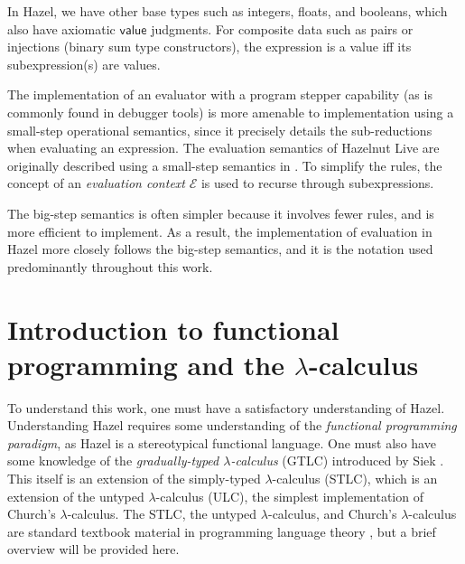 \begin{singlespace}
  \begin{mathpar}
  \end{mathpar}
\end{singlespace}

In Hazel, we have other base types such as integers, floats, and booleans, which also have axiomatic $\textsf{value}$ judgments. For composite data such as pairs or injections (binary sum type constructors), the expression is a value iff its subexpression(s) are values.

The implementation of an evaluator with a program stepper capability (as is commonly found in debugger tools) is more amenable to implementation using a small-step operational semantics, since it precisely details the sub-reductions when evaluating an expression. The evaluation semantics of Hazelnut Live are originally described using a small-step semantics in \cite{conf/popl/HazelnutLive19}. To simplify the rules, the concept of an \textit{evaluation context} $\mathcal{E}$ is used to recurse through subexpressions.

The big-step semantics is often simpler because it involves fewer rules, and is more efficient to implement. As a result, the implementation of evaluation in Hazel more closely follows the big-step semantics, and it is the notation used predominantly throughout this work.

\section{Introduction to functional programming and the $\lambda$-calculus}
\label{sec:fp-lc}

To understand this work, one must have a satisfactory understanding of Hazel. Understanding Hazel requires some understanding of the \textit{functional programming paradigm}, as Hazel is a stereotypical functional language. One must also have some knowledge of the \textit{gradually-typed $\lambda$-calculus} (GTLC) introduced by Siek \cite{Siek06gradualtyping,siek2015refined}. This itself is an extension of the simply-typed $\lambda$-calculus (STLC), which is an extension of the untyped $\lambda$-calculus (ULC), the simplest implementation of Church's $\lambda$-calculus. The STLC, the untyped $\lambda$-calculus, and Church's $\lambda$-calculus are standard textbook material in programming language theory \cite{harper2016practical}, but a brief overview will be provided here.

